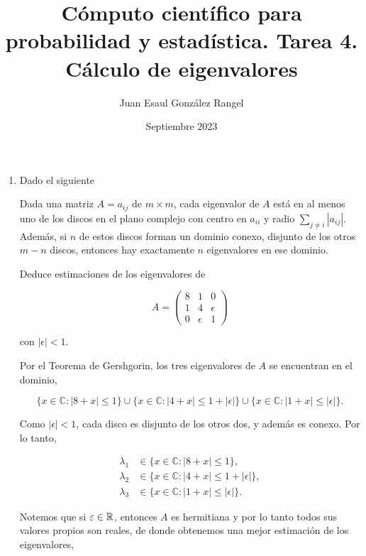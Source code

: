 \documentclass{article}
\title{Cómputo científico para probabilidad y estadística. Tarea 4.\\
Cálculo de eigenvalores}
\author{Juan Esaul González Rangel}
\date{Septiembre 2023}
\renewcommand{\C}{\mathbb{C}}
\begin{document}
\maketitle


\begin{enumerate}

    \item Dado el siguiente

    \begin{theorem}[Gershgorin]
    Dada una matriz $A = a_{ij}$ de $m \times m$, cada eigenvalor de $A$ está en al 
    menos uno de los discos en el plano complejo con centro en $a_{ii}$ y radio 
    $\sum_{j\neq i} |a_{ij}|$. Además, si $n$ de estos discos forman un dominio conexo, 
    disjunto de los otros $m - n$ discos, entonces hay exactamente $n$ eigenvalores 
    en ese dominio.
    \end{theorem}

    Deduce estimaciones de los eigenvalores de

    \[ A = \begin{pmatrix}
        8 & 1 & 0 \\
        1 & 4 & \epsilon \\
        0 & \epsilon & 1
    \end{pmatrix} \]



con $|\epsilon| < 1$.

    Por el Teorema de Gershgorin, los tres eigenvalores de $A$ se encuentran en el dominio,

    \begin{equation*}
        \{ x \in \C : |8 + x| \le 1 \} \cup \{ x \in \C : |4 + x| \le 1 + |\epsilon| \} \cup \{ x \in \C : |1+x| \le |\epsilon|\}.
    \end{equation*}

    Como $|\epsilon|<1$, cada disco es disjunto de los otros dos, y además es conexo. Por lo
    tanto, 

    \begin{align*}
        \lambda_1 &\in \{ x \in \C : |8 + x| \le 1 \},\\
        \lambda_2 &\in \{ x \in \C : |4 + x| \le 1 + |\epsilon| \},\\
        \lambda_3 &\in \{ x \in \C : |1+x| \le |\epsilon|\}.
    \end{align*}

    Notemos que si $\varepsilon \in \mathbb R$, entonces $A$ es hermitiana y por lo tanto todos sus
    valores propios son reales, de donde obtenemos una mejor estimación de los eigenvalores,


\end{enumerate}
\end{document}
